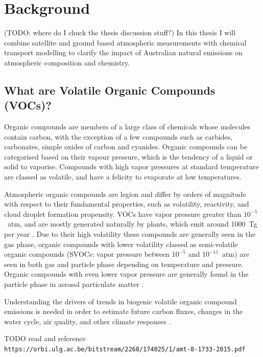 
\chapter{Background} %
\label{ch1}

(TODO: where do I chuck the thesis discussion stuff?)
In this thesis I will combine satellite and ground based atmospheric measurements with chemical transport modelling to clarify the impact of Australian natural emissions on atmospheric composition and chemistry.

\section{What are Volatile Organic Compounds (VOCs)?}
\label{ch1:sec:what_are_vocs}
  Organic compounds are members of a large class of chemicals whose molecules contain carbon, with the exception of a few compounds such as carbides, carbonates, simple oxides of carbon and cyanides.
  Organic compounds can be categorised based on their vapour pressure, which is the tendency of a liquid or solid to vaporise.
  Compounds with high vapor pressures at standard temperature are classed as volatile, and have a felicity to evaporate at low temperatures.
  
  Atmospheric organic compounds are legion and differ by orders of magnitude with respect to their fundamental properties, such as volatility, reactivity, and cloud droplet formation propensity.
  VOCs have vapor pressure greater than $10^{-5}$~atm, and are mostly generated naturally by plants, which emit around 1000~Tg per year \citep{Guenther1995, Glasius2016}.
  Due to their high volatility these compounds are generally seen in the gas phase, organic compounds with lower volatility classed as semi-volatile organic compounds (SVOCs: vapor pressure between $10^{-5}$ and $10^{-11}$~atm) are seen in both gas and particle phase depending on temperature and pressure.
  Organic compounds with even lower vapor pressure are generally found in the particle phase in aerosol particulate matter \citep{Glasius2016}.

  Understanding the drivers of trends in biogenic volatile organic compound emissions is needed in order to estimate future carbon fluxes, changes in the water cycle, air quality, and other climate responses \citep{Yue2015}.

  TODO read and reference \verb|https://orbi.ulg.ac.be/bitstream/2268/174025/1/amt-8-1733-2015.pdf|
  
